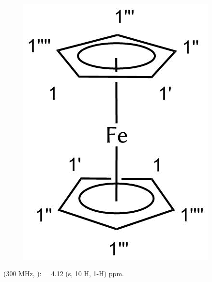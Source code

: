 \documentclass[12pt]{article}
\begin{document}
\begin{onehalfspace}
\begin{figure}[!htbp]
   \centering
\includegraphics[scale=0.4]{auswert.png}
\end{figure}
\noindent
\textbf{} (300 MHz, ): \ce{$\delta$} = 4.12 (s, 10 H, 1-H) ppm.

\end{onehalfspace}
\end{document}

